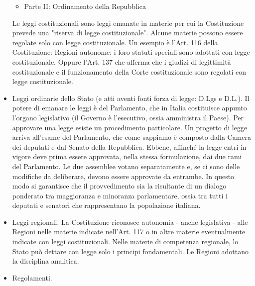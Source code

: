\begin{itemize}
\begin{itemize}
\begin{itemize}
                \end{itemize}
            \item Parte II: Ordinamento della Repubblica
        \end{itemize}
        Le leggi costituzionali sono leggi emanate in materie per cui
        la Costituzione prevede una "riserva di legge costituzionale". Alcune materie possono essere regolate
        solo con legge costituzionale. \newline
        Un esempio è l'Art. 116 della Costituzione: Regioni autonome: i loro
        statuti speciali sono adottati con legge costituzionale. Oppure l'Art. 137 che afferma
        che i giudizi di legittimità costituzionale e il funzionamento della Corte costituzionale
        sono regolati con legge costituzionale.
    \item Leggi ordinarie dello Stato (e atti aventi fonti forza di legge: D.Lgs e D.L.). \newline
        Il potere di emanare le leggi è del Parlamento, che in Italia costituisce appunto l’organo 
        legislativo (il Governo è l’esecutivo, ossia amministra il Paese).\newline
        Per approvare una legge esiste un procedimento particolare. Un progetto di legge arriva 
        all’esame del Parlamento, che come sappiamo è composto dalla Camera dei deputati e dal Senato 
        della Repubblica. Ebbene, affinché la legge entri in vigore deve prima essere approvata, nella 
        stessa formulazione, dai due rami del Parlamento. Le due assemblee votano separatamente e, se 
        ci sono delle modifiche da deliberare, devono essere approvate da entrambe. In questo modo si 
        garantisce che il provvedimento sia la risultante di un dialogo ponderato tra maggioranza e 
        minoranza parlamentare, ossia tra tutti i deputati e senatori che rappresentano la popolazione italiana.
    \item Leggi regionali. \newline
        La Costituzione riconosce autonomia - anche legislativa - alle Regioni nelle materie indicate
        nell'Art. 117 o in altre materie eventualmente indicate con leggi costituzionali.\newline
        Nelle materie di competenza regionale, lo Stato può dettare con legge solo i principi
        fondamentali.\newline
        Le Regioni adottano la disciplina analitica.
    \item Regolamenti.\newline

\end{itemize}
